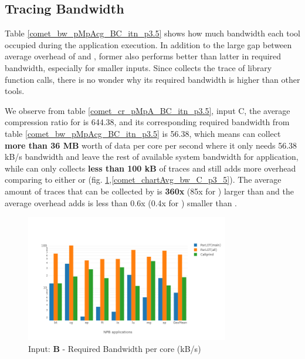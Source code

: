   
\subsection{Tracing Bandwidth}
\label{subsec:lowbw}



Table \ref{comet_bw_pMpAcg_BC_itn_p3.5} shows how much bandwidth each tool occupied during the application execution. In addition to the large gap between average overhead of \parlotm and \callgrind, former also performs better than latter in required bandwidth, especially for smaller inputs. Since \parlota collects the trace of library function calls, there is no wonder why its required bandwidth is higher than other tools.

We observe from table \ref{comet_cr_pMpA_BC_itn_p3.5}, input C, the average compression ratio for \parlota is 644.38, and its corresponding required bandwidth from table \ref{comet_bw_pMpAcg_BC_itn_p3.5} is 56.38, which means \parlot can collect \textbf{more than 36 MB} worth of data per core per second where it only needs 56.38 kB/s bandwidth and leave the rest of available system bandwidth for application, while \callgrind can only collects \textbf{less than 100 kB} of traces and still adds more overhead comparing to either \parlota or \parlotm (fig. \ref{comet_chartAvg_bw_B_p3_5},\ref{comet_chartAvg_bw_C_p3_5}). The average amount of traces that can be collected by \parlota is \textbf{360x} (85x for \parlotm) larger than \callgrind and the average overhead \parlota adds is less than 0.6x (0.4x for \parlotm) smaller than \callgrind.

\begin{figure}[!t]
\centering
\includegraphics[width=3.5in]{figs.comet.newMed/comet_chartAvg_bw_B_p3_5.png}
\caption{ Input: \textbf{B} - Required Bandwidth per core (kB/s)
}
\label{comet_chartAvg_bw_B_p3_5}
\end{figure}



